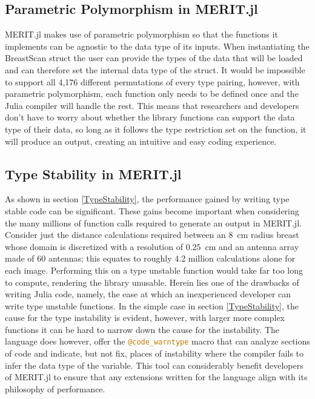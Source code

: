 \subsection{Parametric Polymorphism in MERIT.jl}
MERIT.jl makes use of parametric polymorphism so that the functions it implements can be agnostic to the data type of
its inputs. When instantiating the BreastScan struct the user can provide the types of the data that will be loaded and
can therefore set the internal data type of the struct. It would be impossible to support all 4,176 different
permutations of every type pairing, however, with parametric polymorphism, each function only needs to be defined once
and the Julia compiler will handle the rest. This means that researchers and developers don't have to worry about
whether the library functions can support the data type of their data, so long as it follows the type restriction set on
the function, it will produce an output, creating an intuitive and easy coding experience. 

\subsection{Type Stability in MERIT.jl}
As shown in section \ref{TypeStability}, the performance gained by writing type stable code can be significant. These
gains become important when considering the many millions of function calls required to generate an output in MERIT.jl.
Consider just the distance calculations required between an $8$~cm radius breast whose domain is discretized with a
resolution of $0.25$~cm and an antenna array made of 60 antennas; this equates to roughly 4.2 million calculations alone
for each image. Performing this on a type unstable function would take far too long to compute, rendering the library
unusable. Herein lies one of the drawbacks of writing Julia code, namely, the ease at which an inexperienced developer
can write type unstable functions. In the simple case in section \ref{TypeStability}, the cause for the type instability
is evident, however, with larger more complex functions it can be hard to narrow down the cause for the instability. The
language does however, offer the \lstinline[language=Julia]{@code_warntype} macro that can analyze sections of code and
indicate, but not fix, places of instability where the compiler fails to infer the data type of the variable. This tool
can considerably benefit developers of MERIT.jl to ensure that any extensions written for the language align
with its philosophy of performance.

